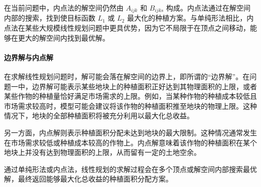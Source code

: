 \documentclass[12pt,a4paper]{nmmcm}
\begin{document}
在当前问题中，内点法的解空间仍然由 $A_{ijk}$ 和 $B_{ijks}$ 构成。内点法通过在解空间内部的搜索，找到使目标函数 $L_1$ 或 $L_2$ 最大化的种植方案。与单纯形法相比，内点法在某些大规模线性规划问题中更具优势，因为它不局限于在顶点之间移动，能够在更大的解空间内找到最优解。

\paragraph{边界解与内点解}

在求解线性规划问题时，解可能会落在解空间的边界上，即所谓的“边界解”。在问题一中，边界解可能表示某些地块上的种植面积正好达到其物理面积的上限，或者某些作物的种植量恰好满足市场需求的上限。例如，当某种作物的种植成本较低且市场需求较高时，模型可能会建议将该作物的种植面积推至地块的物理上限。这种情况下，地块的全部种植面积将被充分利用以最大化总收益。

另一方面，内点解则表示种植面积分配未达到地块的最大限制。这种情况通常发生在市场需求较低或种植成本较高的作物上。内点解意味着该作物的种植面积在某个地块上并没有达到物理面积的上限，从而留有一定的土地空余。

通过单纯形法或内点法，线性规划的求解过程会在多个顶点或解空间内部搜索最优解，最终返回能够最大化总收益的种植面积分配方案。






\end{document}
